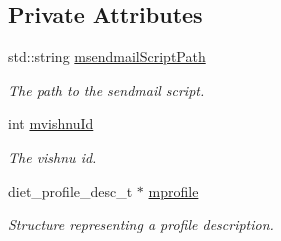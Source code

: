 \subsection*{Private Attributes}
\begin{DoxyCompactItemize}
\item 
\hypertarget{classServerIMS_a4007a5ae7ea32d4a8953662eb5fb4968}{
std::string \hyperlink{classServerIMS_a4007a5ae7ea32d4a8953662eb5fb4968}{msendmailScriptPath}}
\label{classServerIMS_a4007a5ae7ea32d4a8953662eb5fb4968}

\begin{DoxyCompactList}\small\item\em The path to the sendmail script. \item\end{DoxyCompactList}\item 
\hypertarget{classServerIMS_a2dd0bbfd2ca9bbbe3a26c015097eaef2}{
int \hyperlink{classServerIMS_a2dd0bbfd2ca9bbbe3a26c015097eaef2}{mvishnuId}}
\label{classServerIMS_a2dd0bbfd2ca9bbbe3a26c015097eaef2}

\begin{DoxyCompactList}\small\item\em The vishnu id. \item\end{DoxyCompactList}\item 
\hypertarget{classServerIMS_a4af0cf49637c1cd2f95eb831e94538a3}{
diet\_\-profile\_\-desc\_\-t $\ast$ \hyperlink{classServerIMS_a4af0cf49637c1cd2f95eb831e94538a3}{mprofile}}
\label{classServerIMS_a4af0cf49637c1cd2f95eb831e94538a3}

\begin{DoxyCompactList}\small\item\em Structure representing a profile description. \item\end{DoxyCompactList}\end{DoxyCompactItemize}

